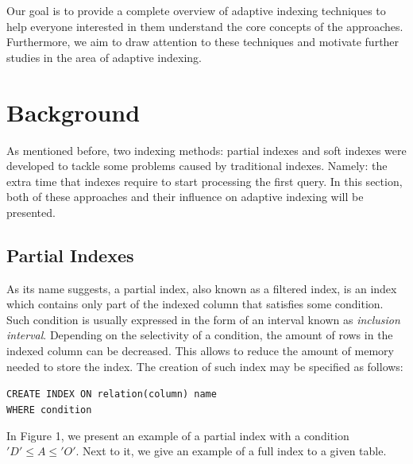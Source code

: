 \documentclass[10pt, conference, compsocconf]{IEEEtran}
\begin{document}
Our goal is to provide a complete overview of adaptive indexing techniques to help everyone interested in them understand the core concepts of the approaches. Furthermore, we aim to draw attention to these techniques and motivate further studies in the area of adaptive indexing.

\section{Background}
\label{sec:background}
As mentioned before, two indexing methods: partial indexes \cite{partial1} and soft indexes \cite{soft_indexes} were developed to tackle some problems caused by traditional indexes. Namely: the extra time that indexes require to start processing the first query. In this section, both of these approaches and their influence on adaptive indexing will be presented.
\subsection{Partial Indexes}
\label{subsec:partial}
As its name suggests, a partial index, also known as a filtered index, is an index which contains only part of the indexed column that satisfies some condition. Such condition is usually expressed in the form of an interval known as \emph{inclusion interval}. Depending on the selectivity of a condition, the amount of rows in the indexed column can be decreased. This allows to reduce the amount of memory needed to store the index. The creation of such index may be specified as follows:
\begin{displayquote}
\texttt{CREATE \hspace{0.2 cm} INDEX \hspace{0.2 cm} ON \hspace{0.2 cm} relation(column) name \\ WHERE \hspace{0.2 cm} condition}
\end{displayquote}

In Figure 1, we present an example of a partial index with a condition $'D' \leq A \leq 'O'$. Next to it, we give an example of a full index to a given table.
\end{document}
